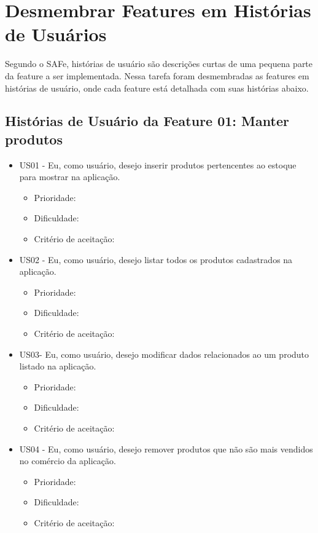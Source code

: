\section{Desmembrar Features em Histórias de Usuários}
Segundo o SAFe, histórias de usuário são descrições curtas de uma pequena parte da feature a ser implementada.
Nessa tarefa foram desmembradas as features em histórias de usuário, onde cada feature está detalhada com suas histórias abaixo.

\subsection{Histórias de Usuário da Feature 01: Manter produtos}

\begin{itemize}
\item US01 - Eu, como usuário, desejo inserir produtos pertencentes ao estoque para mostrar na aplicação.
    \begin{itemize}
    \item Prioridade:
    \item Dificuldade:
    \item Critério de aceitação:
    \end{itemize}

\item US02 - Eu, como usuário, desejo listar todos os produtos cadastrados na aplicação.
    \begin{itemize}
    \item Prioridade:
    \item Dificuldade:
    \item Critério de aceitação:
    \end{itemize}


\item US03- Eu, como usuário, desejo modificar dados relacionados ao um produto listado na aplicação.
    \begin{itemize}
    \item Prioridade:
    \item Dificuldade:
    \item Critério de aceitação:
    \end{itemize}


\item US04 - Eu, como usuário, desejo remover produtos que não são mais vendidos no comércio da aplicação.
    \begin{itemize}
    \item Prioridade:
    \item Dificuldade:
    \item Critério de aceitação:
    \end{itemize}


\end{itemize}

